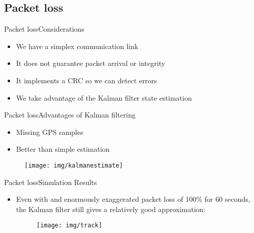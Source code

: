 \documentclass[10pt]{beamer}
\begin{document}

	\subsection{Packet loss}
	\begin{frame}{Packet loss}{Considerations}
		\begin{itemize}
			\item<1-> We have a simplex communication link
			\item<2-> It does not guarantee packet arrival or integrity
			\item<3-> It implements a CRC so we can detect errors
			\item<4-> We take advantage of the Kalman filter state estimation
		\end{itemize}
	\end{frame}


	\begin{frame}{Packet loss}{Advantages of Kalman filtering}
		\begin{itemize}
			\item Missing GPS samples
			\item Better than simple estimation 
		\end{itemize}
		\begin{figure}
			\begin{center}
				\texttt{[image: img/kalmanestimate]}
				\label{fig:kalmanestimate}
			\end{center}
		\end{figure}
	\end{frame}
		

	\begin{frame}{Packet loss}{Simulation Results}
	  \begin{itemize}
	  	\item Even with and enormously exaggerated packet loss of 100\% for 60 seconds, the Kalman filter still gives a relatively good approximation:
		\begin{figure}
			\begin{center}
				\texttt{[image: img/track]}
				\label{fig:packetloss}
			\end{center}
		\end{figure}
	  \end{itemize}
	\end{frame}
\end{document}
